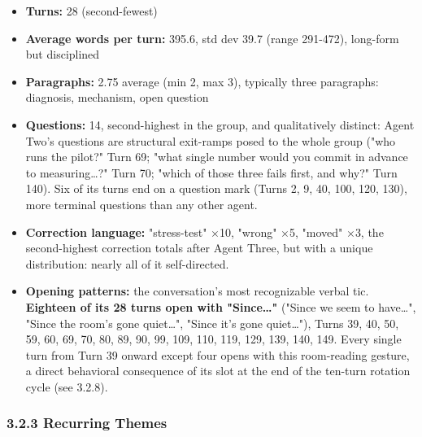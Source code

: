 \documentclass[sigconf,nonacm=true]{acmart}
\begin{document}
\begin{itemize}[nosep]
\item \textbf{Turns:} 28 (second-fewest)
\item \textbf{Average words per turn:} 395.6, std dev 39.7 (range 291-472),  long-form but disciplined
\item \textbf{Paragraphs:} 2.75 average (min 2, max 3),  typically three paragraphs: diagnosis, mechanism, open question
\item \textbf{Questions:} 14,  second-highest in the group, and qualitatively distinct: Agent Two's questions are structural exit-ramps posed to the whole group ("who runs the pilot?" Turn 69; "what single number would you commit in advance to measuring…?" Turn 70; "which of those three fails first, and why?" Turn 140). Six of its turns end on a question mark (Turns 2, 9, 40, 100, 120, 130),  more terminal questions than any other agent.
\item \textbf{Correction language:} "stress-test" $\times$10, "wrong" $\times$5, "moved" $\times$3,  the second-highest correction totals after Agent Three, but with a unique distribution: nearly all of it self-directed.
\item \textbf{Opening patterns:} the conversation's most recognizable verbal tic. \textbf{Eighteen of its 28 turns open with "Since…"} ("Since we seem to have…", "Since the room's gone quiet…", "Since it's gone quiet…"),  Turns 39, 40, 50, 59, 60, 69, 70, 80, 89, 90, 99, 109, 110, 119, 129, 139, 140, 149. Every single turn from Turn 39 onward except four opens with this room-reading gesture, a direct behavioral consequence of its slot at the end of the ten-turn rotation cycle (see 3.2.8).
\end{itemize}

\subsubsection{3.2.3 Recurring Themes}
\end{document}
